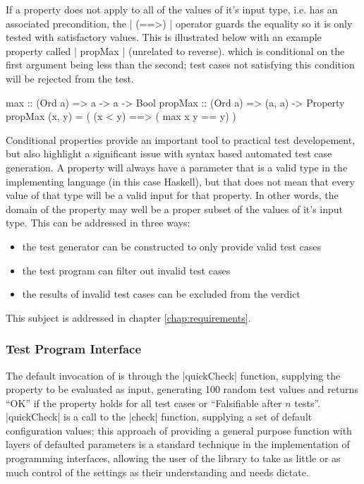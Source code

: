 If a property does not apply to all of the values of it's input type,
i.e. has an associated precondition,
the | (==>) | operator guards the equality so it is only tested with satisfactory values.
This is illustrated below with an example property called | propMax | (unrelated to reverse).
which is conditional on the first argument being less than the second;
test cases not satisfying this condition will be rejected from the test.

\begin{code}

max :: (Ord a) => a -> a -> Bool
propMax :: (Ord a) => (a, a) -> Property
propMax (x, y) = ( (x < y) ==> ( max x y == y) )

\end{code}

Conditional properties provide an important tool to practical test developement,
but also highlight a significant issue with syntax based automated test case generation.
A property will always have a parameter that is a valid type in the implementing language (in this case Haskell),
but that does not mean that every value of that type will be a valid input for that property.
In other words, the domain of the property may well be a proper subset of the values of it's input type.
This can be addressed in three ways:
\begin{itemize}
\item the test generator can be constructed to only provide valid test cases
\item the test program can filter out invalid test cases
\item the results of invalid test cases can be excluded from the verdict
\end{itemize}
This subject is addressed in chapter \ref{chap:requirements}.

\subsubsection{Test Program Interface}
The default invocation of \QC is through the |quickCheck| function,
supplying the property to be evaluated as input,
generating 100 random test values and returns ``OK'' if 
the property holds for all test cases or ``Falsifiable after $n$ tests''.
|quickCheck| is a call to the |check| function, 
supplying a set of default configuration values;
this approach of providing a general purpose function with
layers of defaulted parameters
is a standard technique in the implementation of programming interfaces,
allowing the user of the library to take as little or as much control of the settings
as their understanding and needs dictate.

